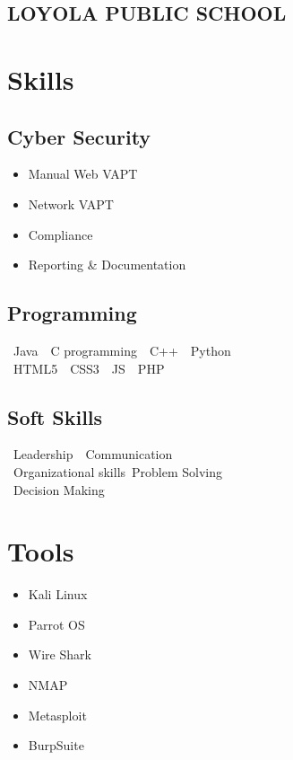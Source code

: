\documentclass[]{roshan-resume}
\begin{document}
\begin{minipage}[t]{0.33\textwidth}
		\subsection{LOYOLA PUBLIC SCHOOL}
		\sectionsep
		
		
		
		\section{Skills}
		\subsection{Cyber Security}
		\begin{itemize}
			\item Manual Web VAPT \\ 
			\item Network VAPT \\
			\item Compliance \\
			\item Reporting \& Documentation	
		\end{itemize}
		\subsection{Programming}
		\textbullet\ Java\ \textbullet\ C programming\ \textbullet\ C++\ \textbullet\ Python \\
		\textbullet\ HTML5\ \textbullet\ CSS3\ \textbullet\ JS\ \textbullet\ PHP 
		\sectionsep
		\subsection{Soft Skills}
		\textbullet\ Leadership\ \textbullet\ Communication\\
		\textbullet\ Organizational skills\ \textbullet Problem Solving \\
		\textbullet\ Decision Making 
		\sectionsep
		\section{Tools}
		\begin{itemize}
			\item Kali Linux \\
			\item Parrot OS \\
			\item Wire Shark \\
			\item NMAP \\
			\item Metasploit \\
			\item BurpSuite
		\end{itemize}
		

\end{minipage}
\end{document}
